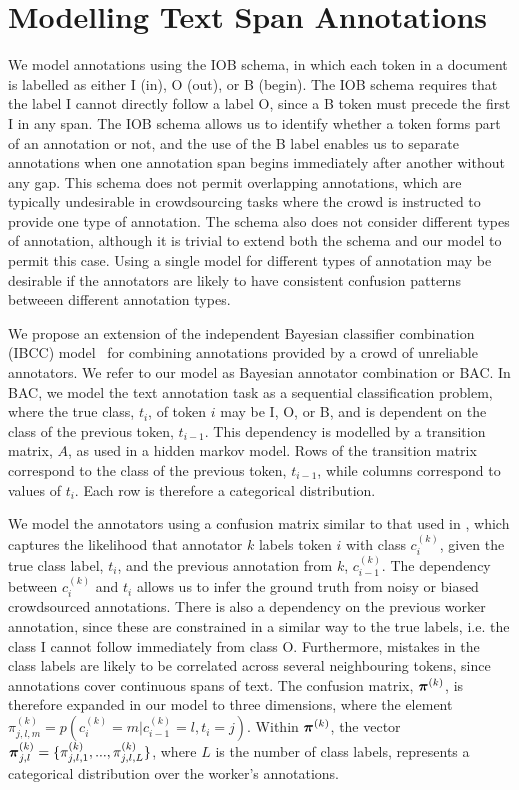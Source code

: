 \section{Modelling Text Span Annotations}\label{sec:model}

We model annotations using the IOB schema, in which each token in a document is labelled as either I (in), O (out), or B (begin). The IOB schema requires that the label I cannot directly follow a label O, since a B token must precede the first I in any span. The IOB schema allows us to identify whether a token forms part of an annotation or not, and the use of the B label enables us to separate annotations when one annotation span begins immediately after another without any gap. This schema does not permit overlapping annotations, which are typically undesirable in crowdsourcing tasks where the crowd is instructed to provide one type of annotation. The schema also does not consider different types of annotation, although it is trivial to extend both the schema and our model to permit this case. Using a single model for different types of annotation may be desirable if the annotators are likely to have consistent confusion patterns betweeen different annotation types. 

We propose an extension of the independent Bayesian classifier combination (IBCC) 
model~\cite{kim2012bayesian} for combining annotations provided by a crowd of unreliable annotators. We refer to our model as Bayesian annotator combination or BAC. In BAC, we model the text annotation task as a sequential classification problem, where the true class, $t_i$, of token $i$ may be I, O, or B, and is dependent on the class of the previous token, $t_{i-1}$. This dependency is modelled by a transition matrix, $A$, as used in a hidden markov model. Rows of the transition matrix correspond to the class of the previous token, $t_{i-1}$, while columns correspond to values of $t_i$. Each row is therefore a categorical distribution. 

We model the annotators using a confusion matrix similar to that used in \cite{simpsonlong}, which captures the likelihood that annotator $k$ labels token $i$ with class $c_i^{(k)}$, given the true class label, $t_i$, and the previous annotation from $k$, $c_{i-1}^{(k)}$. The dependency between $c_i^{(k)}$ and $t_i$ allows us to infer the ground truth from noisy or biased crowdsourced annotations. There is also a dependency on the previous worker annotation, since these are constrained in a similar way to the true labels, i.e. the class I cannot follow immediately from class O. Furthermore, mistakes in the class labels are likely to be correlated across several neighbouring tokens, since annotations cover continuous
spans of text. The confusion matrix, $\boldsymbol\pi^{(k)}$, is therefore expanded in our model to three dimensions, where the element $\pi_{j,l,m}^{(k)} = p(c_i^{(k)} = m | c_{i-1}^{(k)}=l, t_i=j)$. Within $\boldsymbol\pi^{(k)}$, the vector $\boldsymbol\pi_{j,l}^{(k)} = \{ \pi_{j,l,1}^{(k)},...,\pi_{j,l,L}^{(k)}\} $, where $L$ is the number of class labels, represents a categorical distribution over the worker's annotations.

